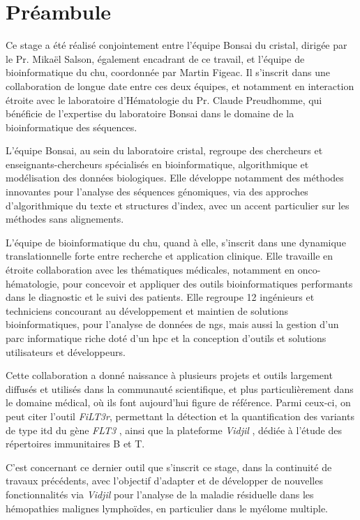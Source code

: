 \chapter{Préambule}

Ce stage a été réalisé conjointement entre l'équipe Bonsai du \gls{cristal}, 
dirigée par le Pr. Mikaël Salson, également encadrant de ce travail, 
et l'équipe de bioinformatique du \gls{chu}, coordonnée par Martin Figeac. 
Il s'inscrit dans une collaboration de longue date entre ces deux équipes, 
et notamment en interaction étroite avec le laboratoire d'Hématologie du Pr. Claude Preudhomme, 
qui bénéficie de l'expertise du laboratoire Bonsai dans le domaine de la bioinformatique 
des séquences.

\vspace{1em}

L'équipe Bonsai, au sein du laboratoire \gls{cristal}, regroupe des chercheurs et enseignants-chercheurs
spécialisés en bioinformatique, algorithmique et modélisation des données biologiques. 
Elle développe notamment des méthodes innovantes pour l'analyse des séquences génomiques, 
via des approches d'algorithmique du texte et structures d'index, avec un accent particulier 
sur les méthodes sans alignements. 

\vspace{1em}

L'équipe de bioinformatique du \gls{chu}, quand à elle, 
s'inscrit dans une dynamique translationnelle forte entre recherche et application clinique. 
Elle travaille en étroite collaboration avec les thématiques médicales, notamment en onco-hématologie, 
pour concevoir et appliquer des outils bioinformatiques performants dans le diagnostic et le suivi des patients.
Elle regroupe 12 ingénieurs et techniciens concourant au développement et maintien de solutions bioinformatiques,
pour l'analyse de données de \gls{ngs}, mais aussi la gestion d'un parc informatique riche doté 
d'un \gls{hpc} et la conception d'outils et solutions utilisateurs et développeurs.

\vspace{1em}

Cette collaboration a donné naissance à plusieurs projets et outils 
largement diffusés et utilisés dans la communauté scientifique, 
et plus particulièrement dans le domaine médical, où ils font aujourd'hui figure de référence. 
Parmi ceux-ci, on peut citer l'outil \textit{FiLT3r}, permettant la détection 
et la quantification des variants de type \gls{itd} du gène \textit{FLT3} \cite{boudryFrugalAlignmentfreeIdentification2022}, 
ainsi que la plateforme \textit{Vidjil} \cite{duezVidjilWebPlatform2016}, dédiée à l'étude des répertoires immunitaires B et T.

\vspace{1em}

C'est concernant ce dernier outil que s'inscrit ce stage, dans la continuité de travaux précédents,
avec l'objectif d'adapter et de développer de nouvelles fonctionnalités via \textit{Vidjil} 
pour l'analyse de la maladie résiduelle dans les hémopathies malignes lymphoïdes, en particulier dans le myélome multiple.
